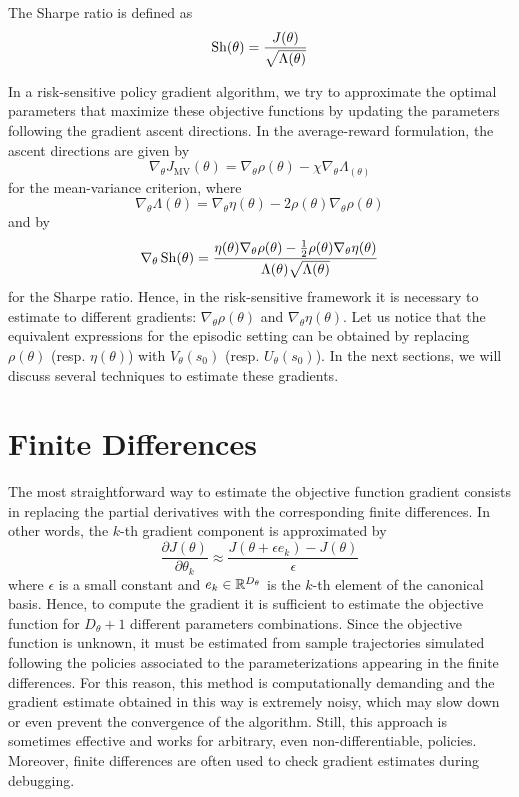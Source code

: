 \begin{definition}
	The Sharpe ratio is defined as 
	\begin{equation}
		\operatorname*{Sh}(\theta) = \frac{J(\theta)}{\sqrt{\Lambda(\theta)}}
	\end{equation}
\end{definition} 
In a risk-sensitive policy gradient algorithm, we try to approximate the optimal parameters that maximize these objective functions by updating the parameters following the gradient ascent directions. In the average-reward formulation, the ascent directions are given by 
\begin{equation}
	\nabla_\theta J_{\text{MV}}(\theta) = \nabla_\theta \rho(\theta) - \chi \nabla_\theta \Lambda_(\theta)
\end{equation}
for the mean-variance criterion, where 
\begin{equation}
	\nabla_\theta \Lambda(\theta) =	\nabla_\theta \eta(\theta) - 2 \rho(\theta) \nabla_\theta \rho(\theta)
\end{equation} 
and by 
\begin{equation} 
	\nabla_\theta \operatorname*{Sh}(\theta) = \frac{\eta(\theta) \nabla_\theta \rho(\theta) - \frac{1}{2} \rho(\theta) \nabla_\theta \eta(\theta)}{\Lambda(\theta) \sqrt{\Lambda(\theta)}}
\end{equation}
for the Sharpe ratio. Hence, in the risk-sensitive framework it is necessary to estimate to different gradients: $\nabla_\theta \rho(\theta)$ and $\nabla_\theta \eta(\theta)$. Let us notice that the equivalent expressions for the episodic setting can be obtained by replacing $\rho(\theta)$ (resp. $\eta(\theta)$) with $V_\theta(s_0)$ (resp. $U_\theta(s_0)$). In the next sections, we will discuss several techniques to estimate these gradients.

\section{Finite Differences}
The most straightforward way to estimate the objective function gradient consists in replacing the partial derivatives with the corresponding finite differences. In other words, the $k$-th gradient component is approximated by
\begin{equation}
	\frac{\partial J(\theta)}{\partial\theta_k} \approx \frac{J(\theta + \epsilon e_k) - J(\theta)}{\epsilon}
\end{equation}
where $\epsilon$ is a small constant and $e_k \in \mathbb{R}^{D_\theta}$ is the $k$-th element of the canonical basis. Hence, to compute the gradient it is sufficient to estimate the objective function for $D_\theta + 1$ different parameters combinations. Since the objective function is unknown, it must be estimated from sample trajectories simulated following the policies associated to the parameterizations appearing in the finite differences. For this reason, this method is computationally demanding and the gradient estimate obtained in this way is extremely noisy, which may slow down or even prevent the convergence of the algorithm. Still, this approach is sometimes effective and works for arbitrary, even non-differentiable, policies. Moreover, finite differences are often used to check gradient estimates during debugging.